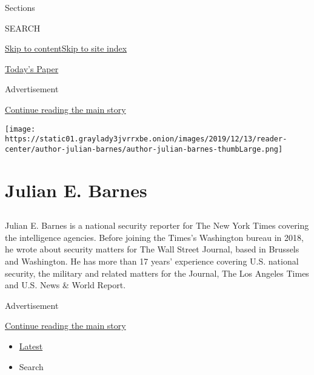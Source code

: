 Sections

SEARCH

\protect\hyperlink{site-content}{Skip to
content}\protect\hyperlink{site-index}{Skip to site index}

\href{https://myaccount.nytimes3xbfgragh.onion/auth/login?response_type=cookie\&client_id=vi}{}

\href{https://www.nytimes3xbfgragh.onion/section/todayspaper}{Today's
Paper}

Advertisement

\protect\hyperlink{after-top}{Continue reading the main story}

\texttt{[image: https://static01.graylady3jvrrxbe.onion/images/2019/12/13/reader-center/author-julian-barnes/author-julian-barnes-thumbLarge.png]}

\hypertarget{julian-e-barnes}{%
\section{Julian E. Barnes}\label{julian-e-barnes}}

\subsection{}

Julian E. Barnes is a national security reporter for The New York Times
covering the intelligence agencies. Before joining the Times's
Washington bureau in 2018, he wrote about security matters for The Wall
Street Journal, based in Brussels and Washington. He has more than 17
years' experience covering U.S. national security, the military and
related matters for the Journal, The Los Angeles Times and U.S. News \&
World Report.

Advertisement

\protect\hyperlink{after-mid1}{Continue reading the main story}

\begin{itemize}
\tightlist
\item
  \protect\hyperlink{stream-panel}{Latest}
\item
  Search
\end{itemize}

